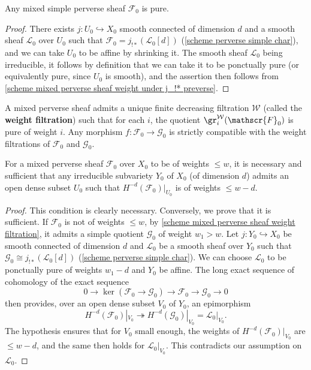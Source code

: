 \begin{corollary}
Any mixed simple perverse sheaf $\mathscr{F}_0$ is pure.
\end{corollary}
\begin{proof}
There exists $j:U_0\hookrightarrow X_0$ smooth connected of dimension $d$ and a smooth sheaf $\mathscr{L}_0$ over $U_0$ such that $\mathscr{F}_0=j_{!*}(\mathscr{L}_0[d])$ (\cref{scheme perverse simple char}), and we can take $U_0$ to be affine by shrinking it. The smooth sheaf $\mathscr{L}_0$ being irreducible, it follows by definition that we can take it to be ponctually pure (or equivalently pure, since $U_0$ is smooth), and the assertion then follows from \cref{scheme mixed perverse sheaf weight under j_!* preverse}.
\end{proof}

\begin{theorem}\label{scheme mixed perverse sheaf weight filtration}
A mixed perverse sheaf admits a unique finite decreasing filtration $\mathcal{W}$ (called the \textbf{weight filtration}) such that for each $i$, the quotient $\gr_i^\mathcal{W}(\mathscr{F}_0)$ is pure of weight $i$. Any morphism $f:\mathscr{F}_0\to\mathscr{G}_0$ is strictly compatible with the weight filtrations of $\mathscr{F}_0$ and $\mathscr{G}_0$.
\end{theorem}

\begin{corollary}\label{scheme mixed perverse sheaf weight iff irredcuibel subvariety}
For a mixed perverse sheaf $\mathscr{F}_0$ over $X_0$ to be of weights $\leq w$, it is necessary and sufficient that any irreducible subvariety $Y_0$ of $X_0$ (of dimension $d$) admits an open dense subset $U_0$ such that $H^{-d}(\mathscr{F}_0)|_{U_0}$ is of weights $\leq w-d$.
\end{corollary}
\begin{proof}
This condition is clearly necessary. Conversely, we prove that it is sufficient. If $\mathscr{F}_0$ is not of weights $\leq w$, by \cref{scheme mixed perverse sheaf weight filtration}, it admits a simple quotient $\mathscr{G}_0$ of weight $w_1>w$. Let $j:Y_0\hookrightarrow X_0$ be smooth connected of dimension $d$ and $\mathscr{L}_0$ be a smooth sheaf over $Y_0$ such that $\mathscr{G}_0\cong j_{!*}(\mathscr{L}_0[d])$ (\cref{scheme perverse simple char}). We can choose $\mathscr{L}_0$ to be ponctually pure of weights $w_1-d$ and $Y_0$ be affine. The long exact sequence of cohomology of the exact sequence
\[0\to\ker(\mathscr{F}_0\to\mathscr{G}_0)\to\mathscr{F}_0\to\mathscr{G}_0\to 0\]
then provides, over an open dense subset $V_0$ of $Y_0$, an epimorphism
\[H^{-d}(\mathscr{F}_0)|_{V_0}\twoheadrightarrow H^{-d}(\mathscr{G}_0)|_{V_0}=\mathscr{L}_0|_{V_0}.\]
The hypothesis ensures that for $V_0$ small enough, the weights of $H^{-d}(\mathscr{F}_0)|_{V_0}$ are $\leq w-d$, and the same then holds for $\mathscr{L}_0|_{V_0}$. This contradicts our assumption on $\mathscr{L}_0$.
\end{proof}

